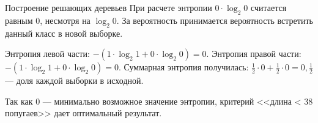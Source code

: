 \documentclass[final]{beamer}
\newlength{\onecolwid}
\newlength{\twocolwid}
\begin{document}
\begin{frame}[t]
\begin{columns}[t]
\begin{column}{\twocolwid}
\begin{columns}[t,totalwidth=\twocolwid]
\begin{column}{\onecolwid}
\begin{block}{Построение решающих деревьев}
При расчете энтропии $0 \cdot \log_2 0$ считается равным 0, несмотря на $\log_2 0$. За вероятность принимается вероятность встретить данный класс в новой выборке.

Энтропия левой части: $-(1 \cdot \log_2 1 + 0 \cdot \log_2 0) = 0$. Энтропия правой части: $-(1 \cdot \log_2 1 + 0 \cdot \log_2 0) = 0$. Суммарная энтропия получилась: $\frac{1}{2} \cdot 0 + \frac{1}{2} \cdot 0 = 0, \frac{1}{2}$ --- доля каждой выборки в исходной. 

Так как 0 --- минимально возможное значение энтропии, критерий <<длина < 38 попугаев>> дает оптимальный результат.
\end{block}



\end{column} %

\end{columns} %




\begin{columns}[t,totalwidth=\twocolwid] %

\begin{column}{\onecolwid} %



\end{column} %

\begin{column}{\onecolwid} %


\end{column}
\end{columns}
\end{column}
\end{columns}
\end{frame}
\end{document}
